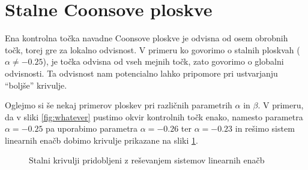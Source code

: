 \documentclass[a4paper,12pt]{article}
\begin{document}
\section{Stalne Coonsove ploskve}
\label{ch:4}

Ena kontrolna točka navadne Coonsove ploskve je odvisna od osem obrobnih točk, 
torej gre za lokalno odvisnost. V primeru ko govorimo o stalnih ploskvah 
($\alpha \neq  -0.25$), je točka odvisna od vseh mejnih točk, zato govorimo 
o globalni odvisnosti. Ta odvisnost nam potencialno lahko pripomore pri ustvarjanju 
``boljše'' krivulje.

Oglejmo si še nekaj primerov ploskev pri različnih parametrih $\alpha$ in $\beta$.
V primeru, da v sliki \ref{fig:whatever} pustimo okvir kontrolnih točk enako,
namesto parametra $\alpha =- 0.25$ pa uporabimo 
parametra $\alpha = -0.26$ ter $\alpha = -0.23$ in rešimo sistem
linearnih enačb dobimo krivulje prikazane na sliki \ref{fig:coons_pospl}.

\begin{figure}[ht!]
   \centering
   \caption{Stalni krivulji pridobljeni z reševanjem sistemov linearnih enačb}
\label{fig:coons_pospl}
\end{figure}
\end{document}
